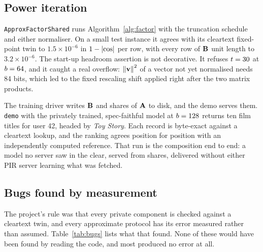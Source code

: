 \subsection{Power iteration}
\label{sec:impl:factor}

\texttt{ApproxFactorShared} runs Algorithm~\ref{alg:factor} with the truncation
schedule and either normaliser. On a small test instance it agrees with its
cleartext fixed-point twin to $1.5 \times 10^{-6}$ in $1 - \left\lvert\cos\right\rvert$ per row,
with every row of $\mathbf{B}$ unit length to $3.2 \times 10^{-6}$. The
start-up headroom assertion is not decorative. It refuses $t = 30$ at
$b = 64$, and it caught a real overflow: $\left\lVert\mathbf{v}\right\rVert^2$ of a vector
not yet normalised needs 84 bits, which led to the fixed rescaling shift applied
right after the two matrix products.

The training driver writes $\mathbf{B}$ and shares of $\mathbf{A}$ to disk, and
the demo serves them. \texttt{demo} with the privately trained, spec-faithful
model at $b = 128$ returns ten film titles for user 42, headed by
\emph{Toy Story}. Each record is byte-exact against a cleartext lookup, and the
ranking agrees position for position with an independently computed reference.
That run is the composition end to end: a model no server saw in the clear,
served from shares, delivered without either PIR server learning what was
fetched.

\subsection{Bugs found by measurement}
\label{sec:impl:bugs}

The project's rule was that every private component is checked against a
cleartext twin, and every approximate protocol has its error measured rather than
assumed. Table~\ref{tab:bugs} lists what that found. None of these would have
been found by reading the code, and most produced no error at all.

